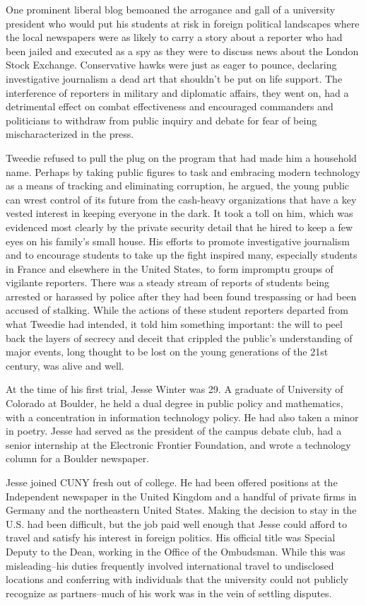 \documentclass[12pt]{book}
\begin{document}
One prominent liberal blog bemoaned the arrogance and gall of a university president who would put his students at risk in foreign political landscapes where the local newspapers were as likely to carry a story about a reporter who had been jailed and executed as a spy as they were to discuss news about the London Stock Exchange.  Conservative hawks were just as eager to pounce, declaring investigative journalism a dead art that shouldn't be put on life support.  The interference of reporters in military and diplomatic affairs, they went on, had a detrimental effect on combat effectiveness and encouraged commanders and politicians to withdraw from public inquiry and debate for fear of being mischaracterized in the press.

Tweedie refused to pull the plug on the program that had made him a household name.  Perhaps by taking public figures to task and embracing modern technology as a means of tracking and eliminating corruption, he argued, the young public can wrest control of its future from the cash-heavy organizations that have a key vested interest in keeping everyone in the dark.  It took a toll on him, which was evidenced most clearly by the private security detail that he hired to keep a few eyes on his family's small house.  His efforts to promote investigative journalism and to encourage students to take up the fight inspired many, especially students in France and elsewhere in the United States, to form impromptu groups of vigilante reporters.  There was a steady stream of reports of students being arrested or harassed by police after they had been found trespassing or had been accused of stalking.  While the actions of these student reporters departed from what Tweedie had intended, it told him something important: the will to peel back the layers of secrecy and deceit that crippled the public's understanding of major events, long thought to be lost on the young generations of the 21st century, was alive and well.

At the time of his first trial, Jesse Winter was 29.  A graduate of University of Colorado at Boulder, he held a dual degree in public policy and mathematics, with a concentration in information technology policy.  He had also taken a minor in poetry.  Jesse had served as the president of the campus debate club, had a senior internship at the Electronic Frontier Foundation, and wrote a technology column for a Boulder newspaper.

Jesse joined CUNY fresh out of college.  He had been offered positions at the Independent newspaper in the United Kingdom and a handful of private firms in Germany and the northeastern United States.  Making the decision to stay in the U.S. had been difficult, but the job paid well enough that Jesse could afford to travel and satisfy his interest in foreign politics.  His official title was Special Deputy to the Dean, working in the Office of the Ombudsman.  While this was misleading--his duties frequently involved international travel to undisclosed locations and conferring with individuals that the university could not publicly recognize as partners--much of his work was in the vein of settling disputes.
\end{document}
